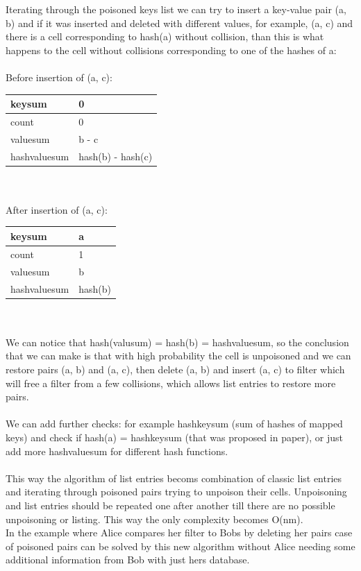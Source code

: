 \documentclass{article}
\begin{document}
Iterating through the poisoned keys list we can try to insert a key-value pair
(a, b) and if it was inserted and deleted with different values, for example, 
(a, c) and there is a cell corresponding to hash(a) without collision, than this
is what happens to the cell without collisions corresponding to one of the hashes 
of a:
\\ \\ 
Before insertion of (a, c):
\begin{tabular}{l | l}
    keysum & 0 \\ \hline
    count & 0 \\ \hline
    valuesum & b - c \\ \hline
    hashvaluesum & hash(b) - hash(c) \\
\end{tabular}
\\ \\

After insertion of (a, c): \ \
\begin{tabular}{l | l}
    keysum & a \\ \hline
    count & 1 \\ \hline
    valuesum & b \\ \hline
    hashvaluesum & hash(b) \\
\end{tabular}
\\ \\
We can notice that hash(valusum) = hash(b) = hashvaluesum, so the conclusion 
that we can make is that with high probability the cell is unpoisoned and we can
restore pairs (a, b) and (a, c), then delete (a, b) and insert (a, c) to filter
which will free a filter from a few collisions, which allows list entries to 
restore more pairs. 
\\ \\
We can add further checks: for example hashkeysum (sum of hashes of mapped keys)
and check if hash(a) = hashkeysum (that was proposed in paper), or just add 
more hashvaluesum for different hash functions.
\\ \\
This way the algorithm of list entries becoms combination of classic list entries
and iterating through poisoned pairs trying to unpoison their cells. Unpoisoning 
and list entries should be repeated one after another till there are no possible 
unpoisoning or listing.
This way the only complexity becomes O(nm). 
\\
In the example where Alice compares her filter to Bobs by deleting her pairs 
case of poisoned pairs can be solved by this new algorithm without Alice needing
some additional information from Bob with just hers database.
\end{document}
